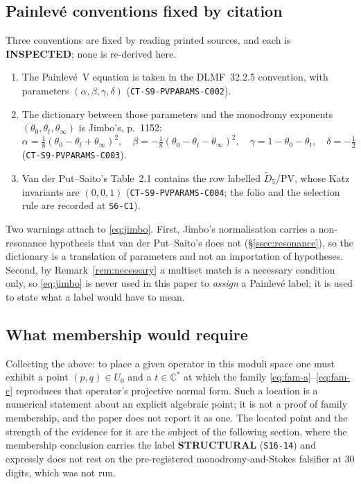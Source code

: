 \subsection{Painlev\'e conventions fixed by citation}\label{ssec:conventions}

Three conventions are fixed by reading printed sources, and each is
\textbf{INSPECTED}; none is re-derived here.

\begin{enumerate}
  \item The Painlev\'e~V equation is taken in the DLMF~32.2.5 convention, with
        parameters $(\alpha,\beta,\gamma,\delta)$
        (\texttt{CT-S9-PVPARAMS-C002}).
  \item The dictionary between those parameters and the monodromy exponents
        $(\theta_0,\theta_t,\theta_\infty)$ is Jimbo's, p.~1152:
        \begin{equation}\label{eq:jimbo}
          \alpha=\tfrac18(\theta_0-\theta_t+\theta_\infty)^2,\quad
          \beta=-\tfrac18(\theta_0-\theta_t-\theta_\infty)^2,\quad
          \gamma=1-\theta_0-\theta_t,\quad
          \delta=-\tfrac12
        \end{equation}
        (\texttt{CT-S9-PVPARAMS-C003}).
  \item Van der Put--Saito's Table~2.1 contains the row labelled
        $\widetilde D_5$/PV, whose Katz invariants are $(0,0,1)$
        (\texttt{CT-S9-PVPARAMS-C004}; the folio and the selection rule are
        recorded at \texttt{S6-C1}).
\end{enumerate}

Two warnings attach to \eqref{eq:jimbo}. First, Jimbo's normalisation carries a
non-resonance hypothesis that van der Put--Saito's does not
(\S\ref{ssec:resonance}), so the dictionary is a translation of parameters and
not an importation of hypotheses. Second, by
Remark~\ref{rem:necessary} a multiset match is a necessary condition only, so
\eqref{eq:jimbo} is never used in this paper to \emph{assign} a Painlev\'e
label; it is used to state what a label would have to mean.

\subsection{What membership would require}\label{ssec:membership}

Collecting the above: to place a given operator in this moduli space one must
exhibit a point $(p,q)\in U_0$ and a $t\in\mathbb C^{*}$ at which the family
\eqref{eq:fam-a}--\eqref{eq:fam-c} reproduces that operator's projective normal
form. Such a location is a numerical statement about an explicit algebraic
point; it is not a proof of family membership, and the paper does not report it
as one. The located point and the strength of the evidence for it are the
subject of the following section, where the membership conclusion carries the
label \textbf{STRUCTURAL} (\texttt{S16-14}) and expressly does not rest on the
pre-registered monodromy-and-Stokes falsifier at $30$ digits, which was not
run.
